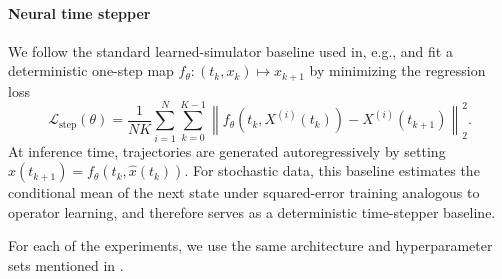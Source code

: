 \documentclass[oneside,11pt]{article}
\theoremstyle{remark}
\begin{document}
\paragraph{Neural time stepper}
We follow the standard learned-simulator baseline used in, e.g., \cite{otness2021an} and fit a deterministic one-step map $f_\theta : (t_k,x_k) \mapsto x_{k+1}$ 
by minimizing the regression loss
\[
    \mathcal L_{\mathrm{step}}(\theta)
    =
    \frac{1}{N K}
    \sum_{i=1}^{N}
    \sum_{k=0}^{K-1}
    \left\|
        f_\theta(t_k,X^{(i)}(t_k))
        -
        X^{(i)}(t_{k+1})
    \right\|_2^2 .
\]
At inference time, trajectories are generated autoregressively by setting $\hat x(t_{k+1}) = f_\theta(t_k,\hat x(t_k))$.  For stochastic data, this baseline estimates the conditional mean of the next state under squared-error training analogous to operator learning, and therefore serves as a deterministic time-stepper baseline.  

For each of the experiments, we use the same architecture and hyperparameter sets mentioned in .
\end{document}

